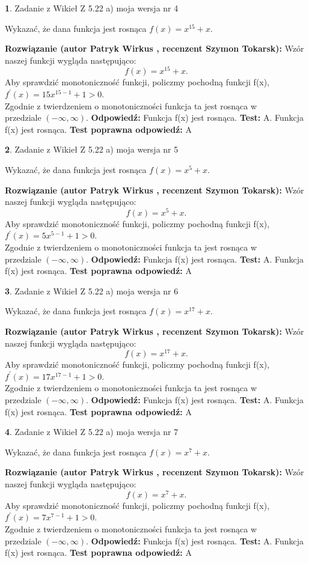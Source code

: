 \documentclass[12pt, a4paper]{article}
\theoremstyle{definition} %
\newtheorem{zad}{}
\newcommand{\zadStart}[1]{\begin{zad}#1\newline}
\newcommand{\zadStop}{\end{zad}}
\newcommand{\rozwStart}[2]{\noindent \textbf{Rozwiązanie (autor #1 , recenzent #2): }\newline}
\newcommand{\rozwStop}{\newline}
\newcommand{\odpStart}{\noindent \textbf{Odpowiedź:}\newline}
\newcommand{\odpStop}{\newline}
\newcommand{\testStart}{\noindent \textbf{Test:}\newline}
\newcommand{\testStop}{\newline}
\newcommand{\kluczStart}{\noindent \textbf{Test poprawna odpowiedź:}\newline}
\newcommand{\kluczStop}{\newline}
\begin{document}
\zadStart{Zadanie z Wikieł Z 5.22 a) moja wersja nr 4}

Wykazać, że dana funkcja jest rosnąca $f(x) = x^{15}+x$.
\zadStop
\rozwStart{Patryk Wirkus}{Szymon Tokarsk}
Wzór naszej funkcji wygląda następująco:
$$f(x) = x^{15}+x.$$
Aby sprawdzić monotoniczność funkcji, policzmy pochodną funkcji f(x),\\ $f^{'}(x) = 15x^{15-1}+1 > 0$.\\
Zgodnie z twierdzeniem o monotoniczności funkcja ta jest rosnąca w\\ przedziale $(-\infty,\infty)$.
\rozwStop
\odpStart
Funkcja f(x) jest rosnąca.
\odpStop
\testStart
A. Funkcja f(x) jest rosnąca.
\testStop
\kluczStart
A
\kluczStop



\zadStart{Zadanie z Wikieł Z 5.22 a) moja wersja nr 5}

Wykazać, że dana funkcja jest rosnąca $f(x) = x^{5}+x$.
\zadStop
\rozwStart{Patryk Wirkus}{Szymon Tokarsk}
Wzór naszej funkcji wygląda następująco:
$$f(x) = x^{5}+x.$$
Aby sprawdzić monotoniczność funkcji, policzmy pochodną funkcji f(x),\\ $f^{'}(x) = 5x^{5-1}+1 > 0$.\\
Zgodnie z twierdzeniem o monotoniczności funkcja ta jest rosnąca w\\ przedziale $(-\infty,\infty)$.
\rozwStop
\odpStart
Funkcja f(x) jest rosnąca.
\odpStop
\testStart
A. Funkcja f(x) jest rosnąca.
\testStop
\kluczStart
A
\kluczStop



\zadStart{Zadanie z Wikieł Z 5.22 a) moja wersja nr 6}

Wykazać, że dana funkcja jest rosnąca $f(x) = x^{17}+x$.
\zadStop
\rozwStart{Patryk Wirkus}{Szymon Tokarsk}
Wzór naszej funkcji wygląda następująco:
$$f(x) = x^{17}+x.$$
Aby sprawdzić monotoniczność funkcji, policzmy pochodną funkcji f(x),\\ $f^{'}(x) = 17x^{17-1}+1 > 0$.\\
Zgodnie z twierdzeniem o monotoniczności funkcja ta jest rosnąca w\\ przedziale $(-\infty,\infty)$.
\rozwStop
\odpStart
Funkcja f(x) jest rosnąca.
\odpStop
\testStart
A. Funkcja f(x) jest rosnąca.
\testStop
\kluczStart
A
\kluczStop



\zadStart{Zadanie z Wikieł Z 5.22 a) moja wersja nr 7}

Wykazać, że dana funkcja jest rosnąca $f(x) = x^{7}+x$.
\zadStop
\rozwStart{Patryk Wirkus}{Szymon Tokarsk}
Wzór naszej funkcji wygląda następująco:
$$f(x) = x^{7}+x.$$
Aby sprawdzić monotoniczność funkcji, policzmy pochodną funkcji f(x),\\ $f^{'}(x) = 7x^{7-1}+1 > 0$.\\
Zgodnie z twierdzeniem o monotoniczności funkcja ta jest rosnąca w\\ przedziale $(-\infty,\infty)$.
\rozwStop
\odpStart
Funkcja f(x) jest rosnąca.
\odpStop
\testStart
A. Funkcja f(x) jest rosnąca.
\testStop
\kluczStart
A
\kluczStop
\end{document}
